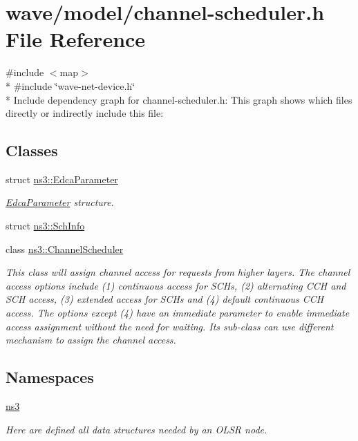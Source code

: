 \hypertarget{channel-scheduler_8h}{}\section{wave/model/channel-\/scheduler.h File Reference}
\label{channel-scheduler_8h}
{\ttfamily \#include $<$map$>$}\\*
{\ttfamily \#include \char`\"{}wave-\/net-\/device.\+h\char`\"{}}\\*
Include dependency graph for channel-\/scheduler.h\+:
This graph shows which files directly or indirectly include this file\+:
\subsection*{Classes}
\begin{DoxyCompactItemize}
\item 
struct \hyperlink{structns3_1_1EdcaParameter}{ns3\+::\+Edca\+Parameter}
\begin{DoxyCompactList}\small\item\em \hyperlink{structns3_1_1EdcaParameter}{Edca\+Parameter} structure. \end{DoxyCompactList}\item 
struct \hyperlink{structns3_1_1SchInfo}{ns3\+::\+Sch\+Info}
\item 
class \hyperlink{classns3_1_1ChannelScheduler}{ns3\+::\+Channel\+Scheduler}
\begin{DoxyCompactList}\small\item\em This class will assign channel access for requests from higher layers. The channel access options include (1) continuous access for S\+C\+Hs, (2) alternating C\+CH and S\+CH access, (3) extended access for S\+C\+Hs and (4) default continuous C\+CH access. The options except (4) have an immediate parameter to enable immediate access assignment without the need for waiting. Its sub-\/class can use different mechanism to assign the channel access. \end{DoxyCompactList}\end{DoxyCompactItemize}
\subsection*{Namespaces}
\begin{DoxyCompactItemize}
\item 
 \hyperlink{namespacens3}{ns3}
\begin{DoxyCompactList}\small\item\em Here are defined all data structures needed by an O\+L\+SR node. \end{DoxyCompactList}\end{DoxyCompactItemize}
